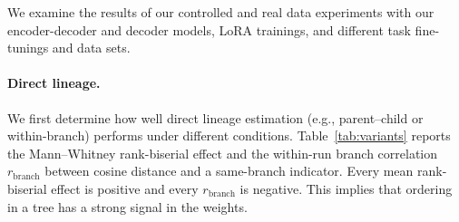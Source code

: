 \documentclass{article}
\theoremstyle{definition}
\theoremstyle{plain}
\begin{document}

We examine the results of our controlled and real data experiments with our encoder-decoder and decoder models, LoRA trainings, and different task fine-tunings and data sets.


\paragraph{Direct lineage.}
We first determine how well direct lineage estimation (e.g., parent--child or within-branch) performs under different conditions. Table~\ref{tab:variants} reports the Mann--Whitney rank-biserial effect and the within-run branch correlation $r_{\mathrm{branch}}$ between cosine distance and a same-branch indicator. Every mean rank-biserial effect is positive and every $r_{\mathrm{branch}}$ is negative. This implies that ordering in a tree has a strong signal in the weights.
\end{document}
